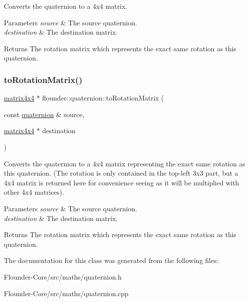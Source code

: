 Converts the quaternion to a 4x4 matrix. 


\begin{DoxyParams}{Parameters}
{\em source} & The source quaternion. \\
\hline
{\em destination} & The destination matrix.\\
\hline
\end{DoxyParams}
\begin{DoxyReturn}{Returns}
The rotation matrix which represents the exact same rotation as this quaternion. 
\end{DoxyReturn}
\mbox{\label{classflounder_1_1quaternion_a27a4276b67f349b8cd79905bbd0c7ae4}} 
\subsubsection{\texorpdfstring{to\+Rotation\+Matrix()}{toRotationMatrix()}}
{\footnotesize\ttfamily \hyperlink{classflounder_1_1matrix4x4}{matrix4x4} $\ast$ flounder\+::quaternion\+::to\+Rotation\+Matrix (\begin{DoxyParamCaption}\item[{const \hyperlink{classflounder_1_1quaternion}{quaternion} \&}]{source,  }\item[{\hyperlink{classflounder_1_1matrix4x4}{matrix4x4} $\ast$}]{destination }\end{DoxyParamCaption})\hspace{0.3cm}{\ttfamily [static]}}



Converts the quaternion to a 4x4 matrix representing the exact same rotation as this quaternion. (The rotation is only contained in the top-\/left 3x3 part, but a 4x4 matrix is returned here for convenience seeing as it will be multiplied with other 4x4 matrices). 


\begin{DoxyParams}{Parameters}
{\em source} & The source quaternion. \\
\hline
{\em destination} & The destination matrix.\\
\hline
\end{DoxyParams}
\begin{DoxyReturn}{Returns}
The rotation matrix which represents the exact same rotation as this quaternion. 
\end{DoxyReturn}


The documentation for this class was generated from the following files\+:\begin{DoxyCompactItemize}
\item 
Flounder-\/\+Core/src/maths/quaternion.\+h\item 
Flounder-\/\+Core/src/maths/quaternion.\+cpp\end{DoxyCompactItemize}
